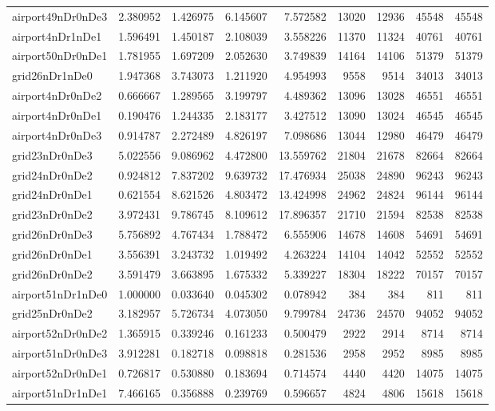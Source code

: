 \begin{longtable}{|l|r|r|r|r|r|r|r|r|}
airport49nDr0nDe3 & 2.380952 & 1.426975 & 6.145607 & 7.572582 & 13020 & 12936 & 45548 & 45548 \\
airport4nDr1nDe1 & 1.596491 & 1.450187 & 2.108039 & 3.558226 & 11370 & 11324 & 40761 & 40761 \\
airport50nDr0nDe1 & 1.781955 & 1.697209 & 2.052630 & 3.749839 & 14164 & 14106 & 51379 & 51379 \\
grid26nDr1nDe0 & 1.947368 & 3.743073 & 1.211920 & 4.954993 & 9558 & 9514 & 34013 & 34013 \\
airport4nDr0nDe2 & 0.666667 & 1.289565 & 3.199797 & 4.489362 & 13096 & 13028 & 46551 & 46551 \\
airport4nDr0nDe1 & 0.190476 & 1.244335 & 2.183177 & 3.427512 & 13090 & 13024 & 46545 & 46545 \\
airport4nDr0nDe3 & 0.914787 & 2.272489 & 4.826197 & 7.098686 & 13044 & 12980 & 46479 & 46479 \\
grid23nDr0nDe3 & 5.022556 & 9.086962 & 4.472800 & 13.559762 & 21804 & 21678 & 82664 & 82664 \\
grid24nDr0nDe2 & 0.924812 & 7.837202 & 9.639732 & 17.476934 & 25038 & 24890 & 96243 & 96243 \\
grid24nDr0nDe1 & 0.621554 & 8.621526 & 4.803472 & 13.424998 & 24962 & 24824 & 96144 & 96144 \\
grid23nDr0nDe2 & 3.972431 & 9.786745 & 8.109612 & 17.896357 & 21710 & 21594 & 82538 & 82538 \\
grid26nDr0nDe3 & 5.756892 & 4.767434 & 1.788472 & 6.555906 & 14678 & 14608 & 54691 & 54691 \\
grid26nDr0nDe1 & 3.556391 & 3.243732 & 1.019492 & 4.263224 & 14104 & 14042 & 52552 & 52552 \\
grid26nDr0nDe2 & 3.591479 & 3.663895 & 1.675332 & 5.339227 & 18304 & 18222 & 70157 & 70157 \\
airport51nDr1nDe0 & 1.000000 & 0.033640 & 0.045302 & 0.078942 & 384 & 384 & 811 & 811 \\
grid25nDr0nDe2 & 3.182957 & 5.726734 & 4.073050 & 9.799784 & 24736 & 24570 & 94052 & 94052 \\
airport52nDr0nDe2 & 1.365915 & 0.339246 & 0.161233 & 0.500479 & 2922 & 2914 & 8714 & 8714 \\
airport51nDr0nDe3 & 3.912281 & 0.182718 & 0.098818 & 0.281536 & 2958 & 2952 & 8985 & 8985 \\
airport52nDr0nDe1 & 0.726817 & 0.530880 & 0.183694 & 0.714574 & 4440 & 4420 & 14075 & 14075 \\
airport51nDr1nDe1 & 7.466165 & 0.356888 & 0.239769 & 0.596657 & 4824 & 4806 & 15618 & 15618 \\

\end{longtable}
